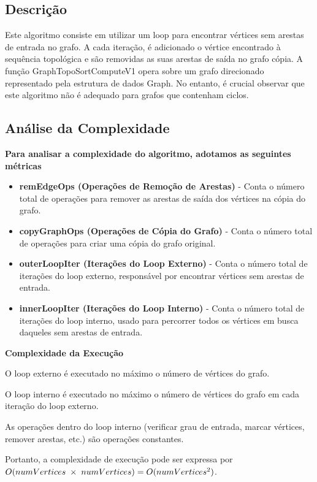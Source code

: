 \documentclass{report}
\begin{document}
\subsection{Descrição}

Este algoritmo consiste em utilizar um loop para encontrar vértices sem arestas de entrada no grafo. A cada iteração, é adicionado o vértice encontrado à sequência topológica e são removidas as suas arestas de saída no grafo cópia.
A função GraphTopoSortComputeV1 opera sobre um grafo direcionado representado pela estrutura de dados Graph. No entanto, é crucial observar que este algoritmo não é adequado para grafos que contenham ciclos. 

\subsection{Análise da Complexidade}

\textbf{Para analisar a complexidade do algoritmo, adotamos as seguintes métricas}


 \begin{itemize}
            \item \textbf{remEdgeOps (Operações de Remoção de Arestas)} - Conta o número total de operações para remover as arestas de saída dos vértices na cópia do grafo.
            \item \textbf{copyGraphOps (Operações de Cópia do Grafo)} - Conta o número total de operações para criar uma cópia do grafo original.
            \item \textbf{outerLoopIter (Iterações do Loop Externo)} - Conta o número total de iterações do loop externo, responsável por encontrar vértices sem arestas de entrada.
            \item \textbf{innerLoopIter (Iterações do Loop Interno)} - Conta o número total de iterações do loop interno, usado para percorrer todos os vértices em busca daqueles sem arestas de entrada.
\end{itemize}


\textbf{Complexidade da Execução}

O loop externo é executado no máximo o número de vértices do grafo.

O loop interno é executado no máximo o número de vértices do grafo em cada iteração do loop externo.

As operações dentro do loop interno (verificar grau de entrada, marcar vértices, remover arestas, etc.) são operações constantes.

Portanto, a complexidade de execução pode ser expressa por \(O(numVertices \hspace{1mm} \times \hspace{1mm} numVertices) = O(numVertices^2)\).
\end{document}
